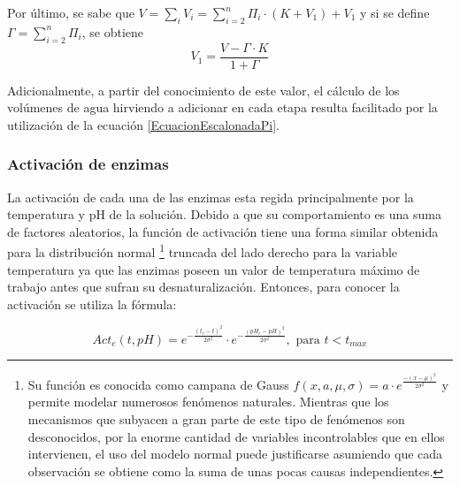\begin{itemize}
                \par Por último, se sabe que $V = \sum_i V_i = \sum_{i=2}^{n} \Pi_i \cdot(K + V_1) + V_1$ y si se define $\Gamma = \sum_{i=2}^n \Pi_i$, se obtiene
                \begin{equation}
                    V_1 = \frac{V - \Gamma \cdot K}{1 + \Gamma}
                \label{EcuacionEscalonadaGamma}
                \end{equation}
                
                \par Adicionalmente, a partir del conocimiento de este valor, el cálculo de los volúmenes de agua hirviendo a adicionar en cada etapa resulta facilitado por la utilización de la ecuación \ref{EcuacionEscalonadaPi}.
            \end{itemize} %
            
        \subsubsection{Activación de enzimas}
        \par La activación de cada una de las enzimas esta regida principalmente por la temperatura y pH de la solución. Debido a que su comportamiento es una suma de factores aleatorios, la función de activación tiene una forma similar obtenida para la distribución normal \footnote{Su función es conocida como campana de Gauss $f(x,a,\mu, \sigma) = a\cdot e^{\frac{-(x - \mu)^2}{2\sigma^2}}$ y permite modelar numerosos fenómenos naturales. Mientras que los mecanismos que subyacen a gran parte de este tipo de fenómenos son desconocidos, por la enorme cantidad de variables incontrolables que en ellos intervienen, el uso del modelo normal puede justificarse asumiendo que cada observación se obtiene como la suma de unas pocas causas independientes.} truncada del lado derecho para la variable temperatura ya que las enzimas poseen un valor de temperatura máximo de trabajo antes que sufran su desnaturalización. Entonces, para conocer la activación se utiliza la fórmula:
        
        \begin{equation}
            Act_e(t, pH) = e^{- \frac{(t_e - t)^2}{2\sigma^2}} \cdot e^{- \frac{(pH_e - pH)^2}{2\sigma^2}}, \text{ para }t< t_{max}
            \label{EcuacionActivacionEnzimas}
        \end{equation}
        
